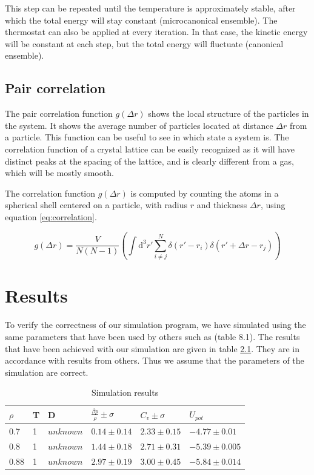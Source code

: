 \documentclass[12pt,a4paper]{report}
\begin{document}
This step can be repeated until the temperature is approximately stable, after which the total energy will stay constant (microcanonical ensemble). The thermostat can also be applied at every iteration. In that case, the kinetic energy will be constant at each step, but the total energy will fluctuate (canonical ensemble).

\section{Pair correlation}

The pair correlation function $g(\Delta r)$ shows the local structure of the particles in the system. It shows the average number of particles located at distance $\Delta r$ from a particle. This function can be useful to see in which state a system is. The correlation function of a crystal lattice can be easily recognized as it will have distinct peaks at the spacing of the lattice, and is clearly different from a gas, which will be mostly smooth.

The correlation function $g(\Delta r)$ is computed by counting the atoms in a spherical shell centered on a particle, with radius $r$ and thickness $\Delta r$, using equation \ref{eq:correlation}.

\begin{equation}\label{eq:correlation}
	g(\Delta r) = \frac{V}{N(N-1)} \left( \int \text{d}^3 r' \sum_{i \neq j}^{N} \delta(r'-r_i) \delta(r' + \Delta r - r_j) \right)
\end{equation}

\chapter{Results}

To verify the correctness of our simulation program, we have simulated using the same parameters that have been used by others such as \cite{thijssen} (table 8.1). The results that have been achieved with our simulation are given in table \ref{table:results}. They are in accordance with results from others. Thus we assume that the parameters of the simulation are correct.
\begin{table}[h]
\caption{Simulation results}\label{table:results}
\begin{center}
	\begin{tabular}{| l | l | l | l | l | l |}
	\hline
	$\rho$ & T & D &$ \frac{\beta p}{\rho} \pm \sigma $& $C_v \pm \sigma$ &$ U_{pot}$ \\
	\hline
	0.7  & 1 & $unknown$ & $0.14 \pm 0.14$ & $2.33 \pm 0.15$ & $-4.77 \pm 0.01$  \\
	0.8  & 1 & $unknown$ & $1.44 \pm 0.18$ & $2.71 \pm 0.31$ & $-5.39 \pm 0.005$ \\
	0.88 & 1 & $unknown$ & $2.97 \pm 0.19$ & $3.00 \pm 0.45$ & $-5.84 \pm 0.014$ \\
	\hline
	\end{tabular}
\end{center}
\end{table}
\end{document}
